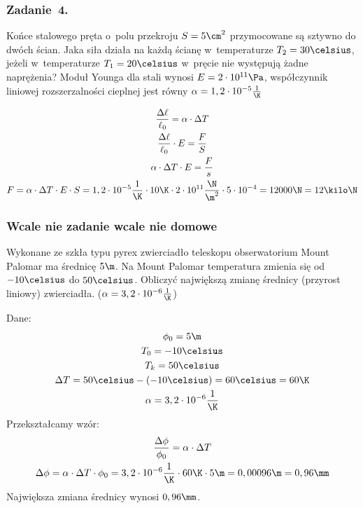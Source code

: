 \subsubsection*{Zadanie~4.}
\begin{statement}
    Końce stalowego pręta o~polu przekroju \(S = 5\cm^2\) przymocowane są sztywno do dwóch ścian. Jaka siła działa na każdą ścianę w~temperaturze \(T_2 = 30\celsius\), jeżeli w~temperaturze \(T_1 = 20\celsius\) w~pręcie nie występują żadne naprężenia? Moduł Younga dla stali wynosi \(E = 2 \cdot 10^{11}\Pa\), współczynnik liniowej rozszerzalności cieplnej jest równy \(\alpha = 1,2 \cdot 10^{-5}\frac{1}{\K}\)
\end{statement}
\begin{gather*}
    \frac{\Delta \ell}{\ell_0} = \alpha \cdot \Delta T\\
    \frac{\Delta \ell}{\ell_0} \cdot E = \frac{F}{S}\\
    \alpha \cdot \Delta T \cdot E = \frac{F}{s}\\
    F = \alpha \cdot \Delta T \cdot E \cdot S
        = 1,2 \cdot 10^{-5}\frac{1}{\K} \cdot 10\K \cdot 2 \cdot 10^{11} \frac{\N}{\m^2} \cdot 5 \cdot 10^{-4}
        = 12000\N
        = 12\kilo\N
\end{gather*}
\subsubsection*{Wcale nie zadanie wcale nie domowe}
\begin{statement}
    Wykonane ze szkła typu pyrex zwierciadło teleskopu obserwatorium Mount Palomar ma średnicę \(5\m\). Na Mount Palomar temperatura zmienia się od \(-10\celsius\) do \(50\celsius\). Obliczyć największą zmianę średnicy (przyrost liniowy) zwierciadła. (\(\alpha = 3,2 \cdot 10^{-6}\frac{1}{\K}\))
\end{statement}
Dane:
\begin{gather*}
    \phi_0 = 5\m\\
    T_0 = -10\celsius\\
    T_k = 50\celsius\\
    \Delta T = 50\celsius - (-10\celsius) = 60\celsius = 60\K\\
    \alpha = 3,2 \cdot 10^{-6}\frac{1}{\K}
\end{gather*}
Przekształcamy wzór:
\begin{gather*}
    \frac{\Delta \phi}{\phi_0} = \alpha \cdot \Delta T\\
    \Delta \phi = \alpha \cdot \Delta T \cdot \phi_0
        = 3,2 \cdot 10^{-6}\frac{1}{\K} \cdot 60\K \cdot 5\m
        = 0,00096\m
        = 0,96\mm
\end{gather*}
Największa zmiana średnicy wynosi \(0,96\mm\).
